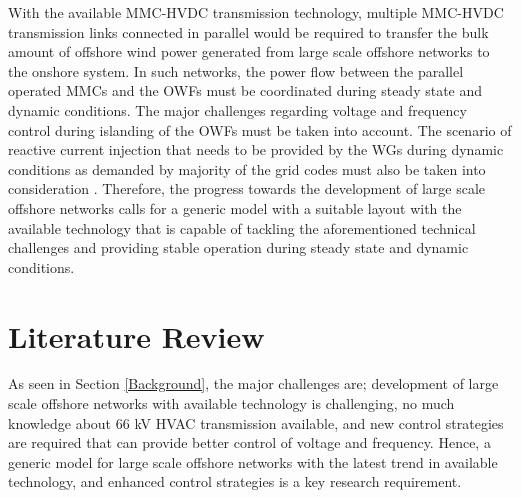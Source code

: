 With the available \gls{MMC}-\gls{HVDC} transmission technology, multiple \gls{MMC}-\gls{HVDC} transmission links connected in parallel would be required to transfer the bulk amount of offshore wind power generated from large scale offshore networks to the onshore system. In such networks, the power flow between the parallel operated \gls{MMC}s and the \gls{OWF}s must be coordinated during steady state and dynamic conditions. The major challenges regarding voltage and frequency control during islanding of the \gls{OWF}s must be taken into account. The scenario of reactive current injection that needs to be provided by the \gls{WG}s during dynamic conditions as demanded by majority of the grid codes must also be taken into consideration \cite{mohseni_review_2012}. Therefore, the progress towards the development of large scale offshore networks calls for a generic model with a suitable layout with the available technology that is capable of tackling the aforementioned technical challenges and providing stable operation during steady state and dynamic conditions. 


\section{Literature Review}

As seen in Section \ref{Background}, the major challenges are; development of large scale offshore networks with available technology is challenging, no much knowledge about 66 kV \gls{HVAC} transmission available, and new control strategies are required that can provide better control of voltage and frequency. Hence, a generic model for large scale offshore networks with the latest trend in available technology, and enhanced control strategies is a key research requirement. 

